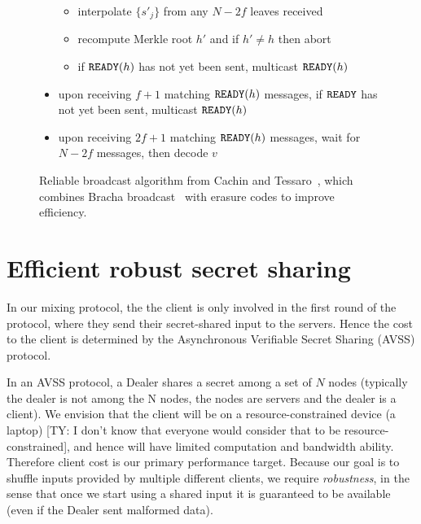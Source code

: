\documentclass{sig-alternate-05-2015}
\newcommand{\tnote}[1]{{\color{green}[TY: #1]}}
\begin{document}
\begin{figure}[t]
\begin{boxedminipage}{\columnwidth}
\begin{itemize}
  \begin{itemize}
  \item interpolate $\{s'_j\}$ from any $N-2f$ leaves received
  \item recompute Merkle root $h'$ and if $h' \neq h$ then abort        \item if $\mathtt {READY}(h)$ has not yet been sent, multicast $\mathtt {READY}(h)$
  \end{itemize}
\item upon receiving $f+1$ matching $\mathtt {READY}(h)$ messages, if $\mathtt {READY}$ has not yet been sent, multicast $\mathtt {READY}(h)$
\item upon receiving $2f+1$ matching $\mathtt {READY}(h)$ messages, wait for $N-2f$  messages, then decode $v$
\end{itemize}
\end{boxedminipage}
\caption{Reliable broadcast algorithm from Cachin and Tessaro~\cite{dispersal}, which combines Bracha broadcast~\cite{bra87} with erasure codes to improve efficiency.}
\label{alg:rbc}
\end{figure}

\section{Efficient robust secret sharing}
In our mixing protocol, the the client is only involved in the first round of the protocol, where they send their secret-shared input to the servers. Hence the cost to the client is determined by the Asynchronous Verifiable Secret Sharing (AVSS) protocol.

In an AVSS protocol, a Dealer shares a secret among a set of $N$ nodes (typically the dealer is not among the N nodes, the nodes are servers and the dealer is a client). We envision that the client will be on a resource-constrained device (a laptop) \tnote{I don't know that everyone would consider that to be resource-constrained}, and hence will have limited computation and bandwidth ability. Therefore client cost is our primary performance target. Because our goal is to shuffle inputs provided by multiple different clients, we require \emph{robustness}, in the sense that once we start using a shared input it is guaranteed to be available (even if the Dealer sent malformed data).
\end{document}
